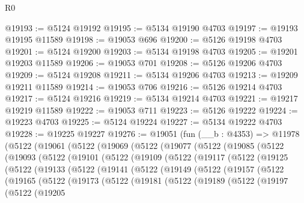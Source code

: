 \begin{lexlean}{R0}
\begin{coremodule}
@19193 := @5124 @19192
@19195 := @5134 @19190 @4703
@19197 := @19193 @19195 @11589
@19198 := @19053 @696
@19200 := @5126 @19198 @4703
@19201 := @5124 @19200
@19203 := @5134 @19198 @4703
@19205 := @19201 @19203 @11589
@19206 := @19053 @701
@19208 := @5126 @19206 @4703
@19209 := @5124 @19208
@19211 := @5134 @19206 @4703
@19213 := @19209 @19211 @11589
@19214 := @19053 @706
@19216 := @5126 @19214 @4703
@19217 := @5124 @19216
@19219 := @5134 @19214 @4703
@19221 := @19217 @19219 @11589
@19222 := @19053 @711
@19223 := @5126 @19222
@19224 := @19223 @4703
@19225 := @5124 @19224
@19227 := @5134 @19222 @4703
@19228 := @19225 @19227
@19276 := @19051
    (fun (__b : @4353) =>
    @11978
      (@5122
        (@19061
          (@5122
            (@19069
              (@5122
                (@19077
                  (@5122
                    (@19085
                      (@5122
                        (@19093
                          (@5122
                            (@19101
                              (@5122
                                (@19109
                                  (@5122
                                    (@19117
                                      (@5122
                                        (@19125
                                          (@5122
                                            (@19133
                                              (@5122
                                                (@19141
                                                  (@5122
                                                    (@19149
                                                      (@5122
                                                        (@19157
                                                          (@5122
                                                            (@19165
                                                              (@5122
                                                                (@19173
                                                                  (@5122
                                                                    (@19181
                                                                      (@5122
                                                                        (@19189
                                                                          (@5122
                                                                            (@19197
                                                                              (@5122
                                                                                (@19205

\end{coremodule}
\end{lexlean}
